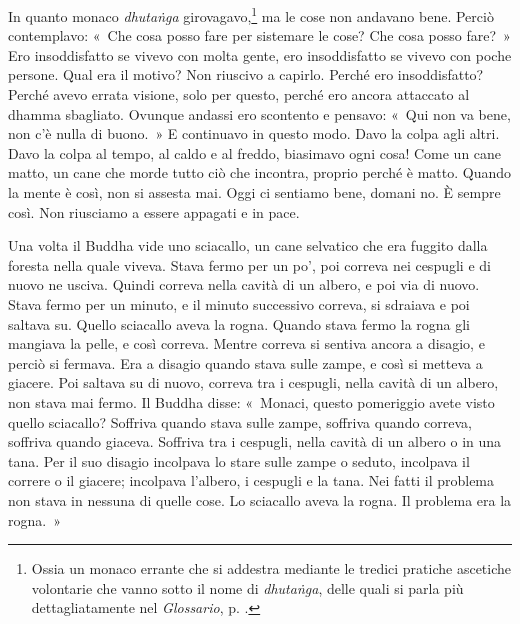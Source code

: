 In quanto monaco \emph{dhutaṅga} girovagavo,\footnote{Ossia un monaco
  errante che si addestra mediante le tredici pratiche ascetiche
  volontarie che vanno sotto il nome di \emph{dhutaṅga}, delle quali si
  parla più dettagliatamente nel \emph{Glossario}, p. \pageref{glossary-dhutanga}.} ma le cose non
andavano bene. Perciò contemplavo: «~Che cosa posso fare per sistemare
le cose? Che cosa posso fare?~» Ero insoddisfatto se vivevo con molta
gente, ero insoddisfatto se vivevo con poche persone. Qual era il
motivo? Non riuscivo a capirlo. Perché ero insoddisfatto? Perché avevo
errata visione, solo per questo, perché ero ancora attaccato al
dhamma sbagliato. Ovunque andassi ero scontento e pensavo: «~Qui
non va bene, non c'è nulla di buono.~» E continuavo in questo modo. Davo
la colpa agli altri. Davo la colpa al tempo, al caldo e al freddo,
biasimavo ogni cosa! Come un cane matto, un cane che morde tutto ciò che
incontra, proprio perché è matto. Quando la mente è così, non si assesta
mai. Oggi ci sentiamo bene, domani no. È sempre così. Non riusciamo a
essere appagati e in pace.

Una volta il Buddha vide uno sciacallo, un cane selvatico che era
fuggito dalla foresta nella quale viveva. Stava fermo per un po', poi
correva nei cespugli e di nuovo ne usciva. Quindi correva nella cavità
di un albero, e poi via di nuovo. Stava fermo per un minuto, e il minuto
successivo correva, si sdraiava e poi saltava su. Quello sciacallo aveva
la rogna. Quando stava fermo la rogna gli mangiava la pelle, e così
correva. Mentre correva si sentiva ancora a disagio, e perciò si
fermava. Era a disagio quando stava sulle zampe, e così si metteva a
giacere. Poi saltava su di nuovo, correva tra i cespugli, nella cavità
di un albero, non stava mai fermo. Il Buddha disse: «~Monaci, questo
pomeriggio avete visto quello sciacallo? Soffriva quando stava sulle
zampe, soffriva quando correva, soffriva quando giaceva. Soffriva tra i
cespugli, nella cavità di un albero o in una tana. Per il suo disagio
incolpava lo stare sulle zampe o seduto, incolpava il correre o il
giacere; incolpava l'albero, i cespugli e la tana. Nei fatti il problema
non stava in nessuna di quelle cose. Lo sciacallo aveva la rogna. Il
problema era la rogna.~»

